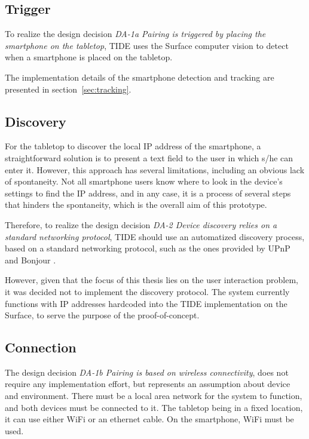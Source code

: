 \subsection{Trigger}

To realize the design decision
\emph{DA-1a Pairing is triggered by placing the smartphone on the tabletop},
TIDE uses the Surface computer vision to detect when a smartphone is placed on the tabletop.

The implementation details of the smartphone detection and tracking are presented in section~\ref{sec:tracking}.

\subsection{Discovery}

For the tabletop to discover the local IP address of the smartphone, a straightforward solution is to present a text field to the user in which s/he can enter it.
However, this approach has several limitations, including an obvious lack of spontaneity.
Not all smartphone users know where to look in the device's settings to find the IP address, and in any case, it is a process of several steps that hinders the spontaneity, which is the overall aim of this prototype.

Therefore, to realize the design decision
\emph{DA-2 Device discovery relies on a standard networking protocol},
TIDE should use an automatized discovery process, based on a standard networking protocol, such as the ones provided by UPnP \citep{upnp} and Bonjour \citep{bonjour}.

However, given that the focus of this thesis lies on the user interaction problem, 
it was decided not to implement the discovery protocol.
The system currently functions with IP addresses hardcoded into the TIDE implementation on the Surface, to serve the purpose of the proof-of-concept.

\subsection{Connection}

The design decision
\emph{DA-1b Pairing is based on wireless connectivity},
does not require any implementation effort, but represents an assumption about device and environment.
There must be a local area network for the system to function, and both devices must be connected to it.
The tabletop being in a fixed location, it can use either WiFi or an ethernet cable.
On the smartphone, WiFi must be used.

